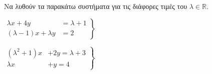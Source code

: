 Να λυθούν τα παρακάτω συστήματα για τις διάφορες τιμές του $ \lambda\in\mathbb{R} $.
\begin{alist}
\item $\left.\begin{array}{rl}
\lambda x+4 y & =\lambda+1 \\
(\lambda-1) x+\lambda y & =2
\end{array}\right\}$
\item $\left.\begin{array}{rl}\left(\lambda^2+1\right) x&+2 y =\lambda+3 \\ \lambda x& +y=4\end{array}\right\}$
\end{alist}
